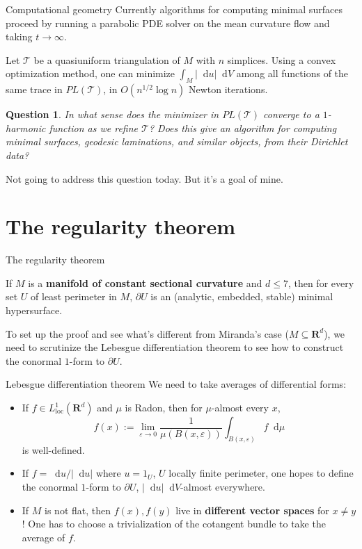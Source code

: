 \documentclass[10pt]{beamer}
\newcommand{\RR}{\mathbf{R}}
\newcommand*\dif{\mathop{}\!\mathrm{d}}
\newcommand{\loc}{\mathrm{loc}}
\newtheorem{question}{Question}
\begin{document}
\begin{frame}{Computational geometry}
Currently algorithms for computing minimal surfaces proceed by running a parabolic PDE solver on the mean curvature flow and taking $t \to \infty$.

\begin{theorem}[Loisel '20]
Let $\mathcal T$ be a quasiuniform triangulation of $M$ with $n$ simplices.
Using a convex optimization method, one can minimize $\int_M |\dif u| \dif V$ among all functions of the same trace in $PL(\mathcal T)$, in $O(n^{1/2} \log n)$ Newton iterations.
\end{theorem}

\begin{question}
In what sense does the minimizer in $PL(\mathcal T)$ converge to a $1$-harmonic function as we refine $\mathcal T$?
Does this give an algorithm for computing minimal surfaces, geodesic laminations, and similar objects, from their Dirichlet data?
\end{question}

Not going to address this question today. But it's a goal of mine.
\end{frame}

\section{The regularity theorem}

\begin{frame}{The regularity theorem}
\begin{theorem}[--, '22]
If $M$ is a \textbf{manifold of constant sectional curvature} and $d \leq 7$, then for every set $U$ of least perimeter in $M$, $\partial U$ is an (analytic, embedded, stable) minimal hypersurface.
\end{theorem}

To set up the proof and see what's different from Miranda's case ($M \subseteq \RR^d$), we need to scrutinize the Lebesgue differentiation theorem to see how to construct the conormal $1$-form to $\partial U$.
\end{frame}

\begin{frame}{Lebesgue differentiation theorem}
We need to take averages of differential forms:
\begin{itemize}
    \item If $f \in L^1_\loc(\RR^d)$ and $\mu$ is Radon, then for $\mu$-almost every $x$,
$$f(x) := \lim_{\varepsilon \to 0} \frac{1}{\mu(B(x, \varepsilon))} \int_{B(x, \varepsilon)} f \dif \mu$$
is well-defined.
    \item If $f = \dif u/|\dif u|$ where $u = 1_U$, $U$ locally finite perimeter, one hopes to define the conormal $1$-form to $\partial U$, $|\dif u|\dif V$-almost everywhere.
    \item If $M$ is not flat, then $f(x), f(y)$ live in \textbf{different vector spaces} for $x \neq y$! One has to choose a trivialization of the cotangent bundle to take the average of $f$.
\end{itemize}
\end{frame}
\end{document}
